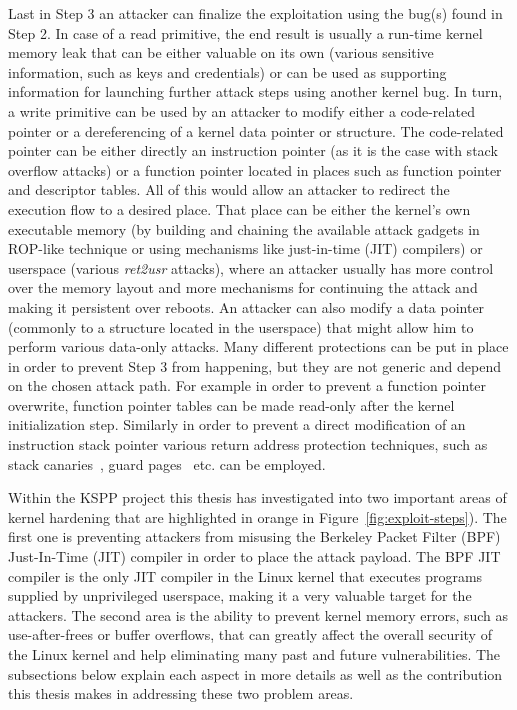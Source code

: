 Last in Step 3 an attacker can finalize the exploitation using the bug(s) found in Step 2. In case of a read primitive, the end result is usually a run-time kernel memory leak that can be either valuable on its own (various sensitive information, such as keys and credentials) or can be used as supporting information for launching further attack steps using another kernel bug. In turn, a write primitive can be used by an attacker to modify either a code-related pointer or a dereferencing of a kernel data pointer or structure. The code-related pointer can be either directly an instruction pointer (as it is the case with stack overflow attacks) or a function pointer located in places such as function pointer and descriptor tables. All of this would allow an attacker to redirect the execution flow to a desired place. That place can be either the kernel's own executable memory (by building and chaining the available attack gadgets in ROP-like technique or using mechanisms like just-in-time (JIT) compilers) or userspace (various \textit{ret2usr} attacks), where an attacker usually has more control over the memory layout and more mechanisms for continuing the attack and making it persistent over reboots. An attacker can also modify a data pointer (commonly to a structure located in the userspace) that might allow him to perform various data-only attacks. Many different protections can be put in place in order to prevent Step 3 from happening, but they are not generic and depend on the chosen attack path. For example in order to prevent a function pointer overwrite, function pointer tables can be made read-only after the kernel initialization step. Similarly in order to prevent a direct modification of an instruction stack pointer various return address protection techniques, such as stack canaries~\cite{edge2014}, guard pages~\cite{kstackoverflow2017} etc. can be employed.    

Within the KSPP project this thesis has investigated into two important areas of kernel hardening that are highlighted in orange in Figure~\ref{fig:exploit-steps}). The first one is preventing attackers from misusing the Berkeley Packet Filter (BPF) Just-In-Time (JIT) compiler in order to place the attack payload. The BPF JIT compiler is the only JIT compiler in the Linux kernel that executes programs supplied by unprivileged userspace, making it a very valuable target for the attackers.  The second area is the ability to prevent kernel memory errors, such as use-after-frees or buffer overflows, that can greatly affect the overall security of the Linux kernel and help eliminating many past and future vulnerabilities. The subsections below explain each aspect in more details as well as the contribution this thesis makes in addressing these two problem areas.  

